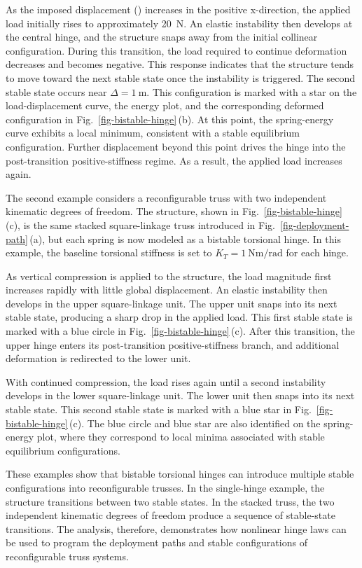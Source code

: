 As the imposed displacement (\Delta) increases in the positive x-direction, the applied load initially rises to approximately 20~N. An elastic instability then develops at the central hinge, and the structure snaps away from the initial collinear configuration. During this transition, the load required to continue deformation decreases and becomes negative. This response indicates that the structure tends to move toward the next stable state once the instability is triggered. The second stable state occurs near \(\Delta=1~\text{m}\). This configuration is marked with a star on the load-displacement curve, the energy plot, and the corresponding deformed configuration in Fig.~\ref{fig-bistable-hinge}\,(b). At this point, the spring-energy curve exhibits a local minimum, consistent with a stable equilibrium configuration. Further displacement beyond this point drives the hinge into the post-transition positive-stiffness regime. As a result, the applied load increases again.

The second example considers a reconfigurable truss with two independent kinematic degrees of freedom. The structure, shown in Fig.~\ref{fig-bistable-hinge}\,(c), is the same stacked square-linkage truss introduced in Fig.~\ref{fig-deployment-path}\,(a), but each spring is now modeled as a bistable torsional hinge. In this example, the baseline torsional stiffness is set to \(K_T=1~\text{Nm/rad}\) for each hinge.

As vertical compression is applied to the structure, the load magnitude first increases rapidly with little global displacement. An elastic instability then develops in the upper square-linkage unit. The upper unit snaps into its next stable state, producing a sharp drop in the applied load. This first stable state is marked with a blue circle in Fig.~\ref{fig-bistable-hinge}\,(c). After this transition, the upper hinge enters its post-transition positive-stiffness branch, and additional deformation is redirected to the lower unit.

With continued compression, the load rises again until a second instability develops in the lower square-linkage unit. The lower unit then snaps into its next stable state. This second stable state is marked with a blue star in Fig.~\ref{fig-bistable-hinge}\,(c). The blue circle and blue star are also identified on the spring-energy plot, where they correspond to local minima associated with stable equilibrium configurations.

These examples show that bistable torsional hinges can introduce multiple stable configurations into reconfigurable trusses. In the single-hinge example, the structure transitions between two stable states. In the stacked truss, the two independent kinematic degrees of freedom produce a sequence of stable-state transitions. The analysis, therefore, demonstrates how nonlinear hinge laws can be used to program the deployment paths and stable configurations of reconfigurable truss systems.

